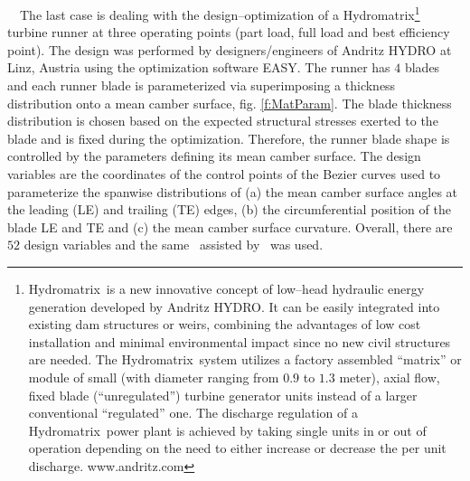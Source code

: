 \documentclass{vki_ls}
\newcommand{\xeraki}{\Pisymbol{ding}{13}~~}
\begin{document}
%
%
\xeraki The last case is dealing with the design--optimization of a Hydromatrix\textregistered\footnote{Hydromatrix\textregistered~is a new innovative concept of low--head hydraulic energy generation developed by Andritz HYDRO. It can be easily integrated into existing dam structures or weirs, combining the advantages of low cost installation and minimal environmental impact since no new civil structures are needed. The Hydromatrix\textregistered~system utilizes a factory assembled ``matrix'' or module of small (with diameter ranging from $0.9$ to $1.3$ meter), axial flow, fixed blade (``unregulated'') turbine generator units instead of a larger conventional ``regulated'' one.  The discharge regulation  of a Hydromatrix\textregistered~power plant is achieved by taking single units in or out of operation depending on the need to either increase or decrease the per unit discharge. www.andritz.com} turbine runner at three operating points (part load, full load and best efficiency point).
The design was performed by designers/engineers of Andritz HYDRO at Linz, Austria using the optimization software EASY.
The runner has $4$ blades and each runner blade is parameterized via superimposing a thickness distribution onto a mean camber surface, fig. \ref{f:MatParam}. 
The blade thickness distribution is chosen based on the expected structural stresses exerted to the blade and is fixed during the optimization. Therefore, the runner blade shape is controlled by the parameters defining its mean camber surface. 
The design variables are the coordinates of the control points of the Bezier curves used to parameterize the spanwise distributions of (a) the mean camber surface angles at the leading (LE) and trailing (TE) edges, (b) the circumferential position of the blade LE and TE and (c) the mean camber surface curvature. Overall, there are $52$ design variables and the same \MAEA\ assisted by \PCA\ was used.
\end{document}
